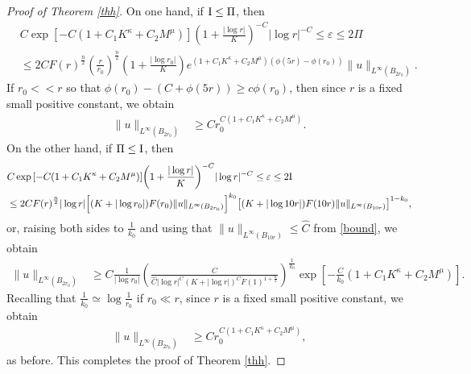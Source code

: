 \documentclass[11pt]{amsart}
\theoremstyle{plain}
\numberwithin{equation}{section}
\begin{document}
\begin{proof} [Proof of Theorem  \ref{thh}]
On one hand, if ${\rm I} \leq \Pi$, then
\begin{align*}
&C \exp{\left[{-C {\left( {1 + C_1 K^\kappa + C_2 M^\mu} \right) } }\right]}{\left( {1+\frac{|\log r|}{K}} \right) }^{-C} |\log r|^{-C}
\le {\varepsilon} \le 2 \Pi \\
&\le 2 C F{\left( {r} \right) }^{\frac n 2} {\left( {\frac{r }{r_0 }} \right) }^{\frac n 2} {\left( {1 +\frac{|\log r_0|}{K}} \right) } e^{{\left( {1 + C_1 K^\kappa + C_2 M^\mu} \right) } {\left( {\phi{\left( {5r} \right) }-\phi(r_0)} \right) }} \|u\|_{L^{\infty}(B_{2r_0})}.
\end{align*}
If $r_0 << r$ so that $\phi{\left( {r_0} \right) }-{\left( {C + \phi{\left( {5r} \right) }} \right) } \ge c \phi{\left( {r_0} \right) }$, then since $r$ is a fixed small positive constant, we obtain
\begin{align*}
\|u\|_{L^{\infty}(B_{2r_0})}
&\ge C r_0^{C {\left( {1 + C_1 K^\kappa + C_2 M^\mu} \right) } }.
\end{align*}
On the other hand, if $\Pi \leq {\rm I}$, then
\begin{align*}
&C \exp{\left[{-C {\left( {1 + C_1 K^\kappa + C_2 M^\mu} \right) } }\right]}{\left( {1+\frac{|\log r|}{K}} \right) }^{-C} |\log r|^{-C}
\le {\varepsilon} \le 2 {\rm I} \\
&\le 2 C F{\left( {r} \right) }^{\frac n 2} |\log r| {\left[{(K+|\log r_0|) F{\left( {r_0} \right) }
\|u\|_{L^{\infty}(B_{2r_0})}}\right]}^{k_0} {\left[{(K+|\log 10r|)  F{\left( {10 r} \right) }
\|u\|_{L^{\infty}(B_{10 r})}}\right]}^{1 - k_0},
\end{align*}
or, raising both sides to $\frac{1}{k_0}$ and using that
$\|u\|_{L^\infty{\left( {B_{10r}} \right) }}\leq \hat{C}$ from \eqref{bound}, we obtain
\begin{align*}
 \|u\|_{L^{\infty}(B_{2r_0})}
 &\ge C\frac{1}{|\log r_0|} {\left( {\frac{C}{\hat C {\left\vert{\log r}\right\vert}^C {\left( {K+|\log r|} \right) }^C F{\left( {1} \right) }^{1+ \frac n {2}} }} \right) }^{\frac 1 {k_0}} \exp{\left[{-\frac{C}{k_0} {\left( {1 + C_1 K^\kappa + C_2 M^\mu} \right) } }\right]}.
\end{align*}
Recalling that $\frac{1}{k_0}\simeq\log \frac{1}{r_0}$ if $ r_0\ll r$, since $r$ is a fixed small positive constant, we obtain
\begin{align*}
 \|u\|_{L^{\infty}(B_{2r_0})}
 &\ge C r_0^{C{\left( {1 + C_1 K^\kappa + C_2 M^\mu} \right) }},
\end{align*}
as before.
This completes the proof of Theorem \ref{thh}.
\end{proof}
\end{document}
